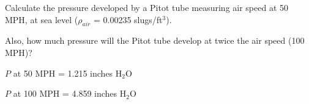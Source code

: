 

Calculate the pressure developed by a Pitot tube measuring air speed at 50 MPH, at sea level ($\rho_{air}$ = 0.00235 slugs/ft$^{3}$).

\vskip 10pt

Also, how much pressure will the Pitot tube develop at twice the air speed (100 MPH)?







$P$ at 50 MPH = 1.215 inches H$_{2}$O

\vskip 10pt

$P$ at 100 MPH = 4.859 inches H$_{2}$O











